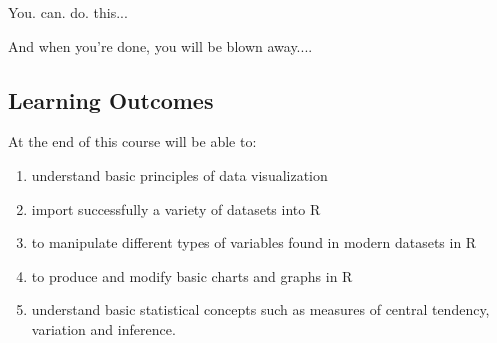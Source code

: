 \documentclass{article}
\begin{document}
You. can. do. this...

And when you're done, you will be blown away....

\subsection*{Learning Outcomes}
At the end of this course will be able to:
\begin{enumerate}
\item understand basic principles of data visualization
\item import successfully a variety of datasets into R
\item to manipulate different types of variables found in modern datasets in R
\item to produce and modify basic charts and graphs in R
\item understand basic statistical concepts such as measures of central tendency, variation and inference. 
\end{enumerate}
\end{document}
